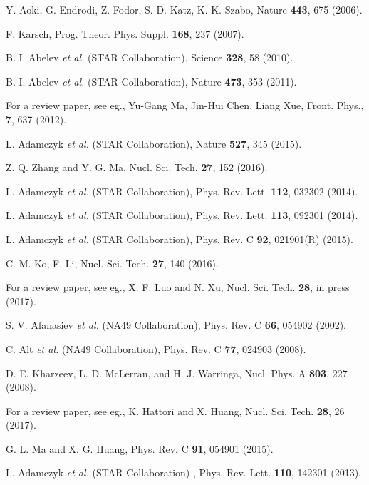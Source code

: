 \documentclass[twocolumn,aps,prc,showpacs,superscriptaddress,preprintnumbers,floatfix,nofootinbib]{revtex4}
\begin{document}
\begin{CJK*}{GBK}{song}
\begin{thebibliography}{88}

 Y. Aoki, G. Endrodi, Z. Fodor, S. D. Katz, K. K. Szabo, Nature {\bf 443}, 675 (2006).

 F. Karsch, Prog. Theor. Phys. Suppl. {\bf 168}, 237 (2007).

B. I. Abelev {\it et al.}  (STAR Collaboration), Science {\bf 328}, 58 (2010).

 B. I. Abelev {\it et al.} (STAR Collaboration), Nature {\bf 473}, 353 (2011).

For a review paper, see eg., Yu-Gang Ma,  Jin-Hui Chen, Liang Xue, Front. Phys., {\bf 7}, 637 (2012).

L. Adamczyk {\it et al.} (STAR Collaboration),  Nature {\bf 527}, 345 (2015).

Z. Q. Zhang and Y. G. Ma, Nucl. Sci. Tech. {\bf 27}, 152 (2016).

 L. Adamczyk {\it et al.} (STAR Collaboration), Phys. Rev. Lett. {\bf 112}, 032302 (2014).

 L. Adamczyk {\it et al.} (STAR Collaboration), Phys. Rev. Lett. {\bf 113}, 092301 (2014).

 L. Adamczyk {\it et al.} (STAR Collaboration), Phys. Rev. C {\bf 92}, 021901(R) (2015).

 C. M. Ko, F. Li, Nucl. Sci. Tech. {\bf 27}, 140  (2016).

 For a review paper, see eg., X. F. Luo and N. Xu, Nucl. Sci. Tech. {\bf 28}, in press (2017).

 S. V. Afanasiev {\it et al.} (NA49 Collaboration), Phys. Rev. C {\bf 66}, 054902 (2002).

 C. Alt {\it et al.} (NA49 Collaboration), Phys. Rev. C {\bf 77}, 024903 (2008).

D. E. Kharzeev, L. D. McLerran, and H. J. Warringa, Nucl. Phys. A {\bf 803}, 227 (2008).

For a review paper, see eg.,  K. Hattori and X. Huang, Nucl. Sci. Tech. {\bf  28}, 26 (2017).

G. L. Ma and X. G. Huang, Phys. Rev. C {\bf 91}, 054901 (2015).

 L. Adamczyk {\it et al.} (STAR Collaboration) , Phys. Rev. Lett. {\bf 110}, 142301 (2013).


\end{thebibliography}
\end{CJK*}
\end{document}
